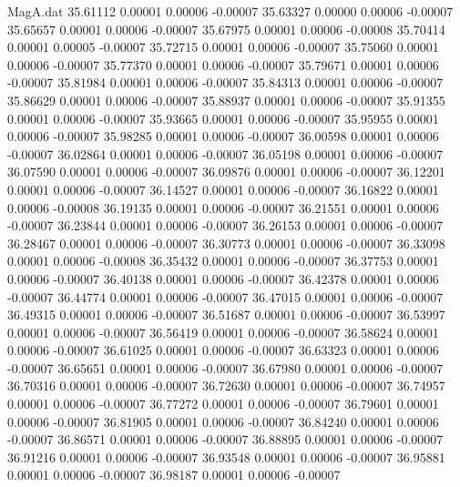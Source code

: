 \begin{filecontents}{MagA.dat}
  35.61112    0.00001    0.00006   -0.00007
  35.63327    0.00000    0.00006   -0.00007
  35.65657    0.00001    0.00006   -0.00007
  35.67975    0.00001    0.00006   -0.00008
  35.70414    0.00001    0.00005   -0.00007
  35.72715    0.00001    0.00006   -0.00007
  35.75060    0.00001    0.00006   -0.00007
  35.77370    0.00001    0.00006   -0.00007
  35.79671    0.00001    0.00006   -0.00007
  35.81984    0.00001    0.00006   -0.00007
  35.84313    0.00001    0.00006   -0.00007
  35.86629    0.00001    0.00006   -0.00007
  35.88937    0.00001    0.00006   -0.00007
  35.91355    0.00001    0.00006   -0.00007
  35.93665    0.00001    0.00006   -0.00007
  35.95955    0.00001    0.00006   -0.00007
  35.98285    0.00001    0.00006   -0.00007
  36.00598    0.00001    0.00006   -0.00007
  36.02864    0.00001    0.00006   -0.00007
  36.05198    0.00001    0.00006   -0.00007
  36.07590    0.00001    0.00006   -0.00007
  36.09876    0.00001    0.00006   -0.00007
  36.12201    0.00001    0.00006   -0.00007
  36.14527    0.00001    0.00006   -0.00007
  36.16822    0.00001    0.00006   -0.00008
  36.19135    0.00001    0.00006   -0.00007
  36.21551    0.00001    0.00006   -0.00007
  36.23844    0.00001    0.00006   -0.00007
  36.26153    0.00001    0.00006   -0.00007
  36.28467    0.00001    0.00006   -0.00007
  36.30773    0.00001    0.00006   -0.00007
  36.33098    0.00001    0.00006   -0.00008
  36.35432    0.00001    0.00006   -0.00007
  36.37753    0.00001    0.00006   -0.00007
  36.40138    0.00001    0.00006   -0.00007
  36.42378    0.00001    0.00006   -0.00007
  36.44774    0.00001    0.00006   -0.00007
  36.47015    0.00001    0.00006   -0.00007
  36.49315    0.00001    0.00006   -0.00007
  36.51687    0.00001    0.00006   -0.00007
  36.53997    0.00001    0.00006   -0.00007
  36.56419    0.00001    0.00006   -0.00007
  36.58624    0.00001    0.00006   -0.00007
  36.61025    0.00001    0.00006   -0.00007
  36.63323    0.00001    0.00006   -0.00007
  36.65651    0.00001    0.00006   -0.00007
  36.67980    0.00001    0.00006   -0.00007
  36.70316    0.00001    0.00006   -0.00007
  36.72630    0.00001    0.00006   -0.00007
  36.74957    0.00001    0.00006   -0.00007
  36.77272    0.00001    0.00006   -0.00007
  36.79601    0.00001    0.00006   -0.00007
  36.81905    0.00001    0.00006   -0.00007
  36.84240    0.00001    0.00006   -0.00007
  36.86571    0.00001    0.00006   -0.00007
  36.88895    0.00001    0.00006   -0.00007
  36.91216    0.00001    0.00006   -0.00007
  36.93548    0.00001    0.00006   -0.00007
  36.95881    0.00001    0.00006   -0.00007
  36.98187    0.00001    0.00006   -0.00007

\end{filecontents}
